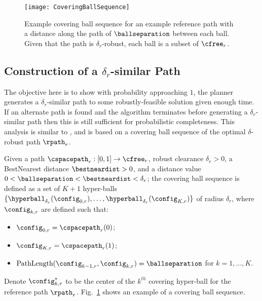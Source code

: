 

\begin{figure}
    \centering
    \texttt{[image: CoveringBallSequence]}
    \caption{Example covering ball sequence for an example reference path with a distance along the path of $\ballseparation$ between each ball. Given that the path is $\delta_r$-robust, each ball is a subset of $\cfree_r$.}
    \label{fig:covering_ball_sequence}
\end{figure}


\subsection{Construction of a $\delta_r$-similar Path}
\label{sec:delta_sim_traj_construction}

The objective here is to show with probability approaching $1$, the planner generates a $\delta_r$-similar path to some robustly-feasible solution given enough time.  If an alternate path is found and the algorithm terminates before generating a $\delta_r$-similar path then this is still sufficient for probabilistic completeness.  This analysis is similar to \cite{LiAOKP2016}, and is based on a covering ball sequence of the optimal  $\delta$-robust path $\rpath_r$.

\begin{definition}
    \label{def:coveringballseq}
    Given a path $\cspacepath_r : [0, 1] \rightarrow \cfree_r$, robust clearance $\delta_r > 0$, a BestNearest distance $\bestneardist > 0$, and a distance value $0 < \ballseparation < \bestneardist < \delta_r$; the covering ball sequence is defined as a set of $K + 1$ hyper-balls $\{ \hyperball_{\delta_r}(\config_{0,r}), \dots, \hyperball_{\delta_r}(\config_{K,r}) \}$ of radius $\delta_r$, where $\config_{k,r}$ are defined such that:
    \begin{itemize}
        \item $\config_{0,r} = \cspacepath_r(0)$;
        \item $\config_{K,r} = \cspacepath_r(1)$;
        \item $\textup{PathLength}(\config_{k-1,r}, \config_{k,r}) = \ballseparation$ for $k = 1, \dots, K$.
    \end{itemize}
\end{definition}
\noindent
Denote $\config^*_{k,r}$ to be the center of the $k^{th}$ covering hyper-ball for the reference path $\rpath_r$. Fig.~\ref{fig:covering_ball_sequence} shows an example of a covering ball sequence.




